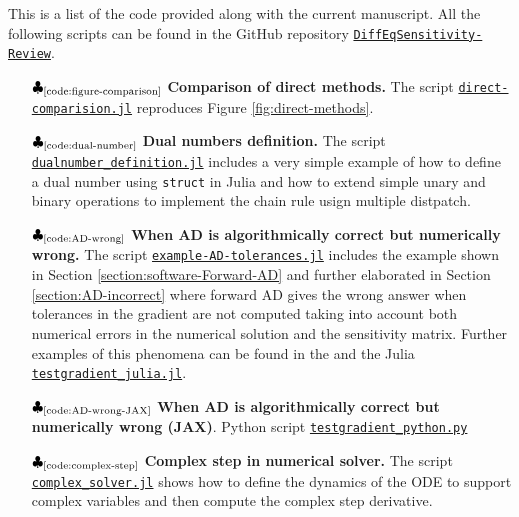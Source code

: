 This is a list of the code provided along with the current manuscript.
All the following scripts can be found in the GitHub repository \href{https://github.com/ODINN-SciML/DiffEqSensitivity-Review}{\texttt{DiffEqSensitivity-Review}}. 
 
\begin{itemize}
    \item[$\clubsuit_\text{\ref{code:figure-comparison}}$] \textbf{Comparison of direct methods.} The script \href{https://github.com/ODINN-SciML/DiffEqSensitivity-Review/blob/main/code/DirectMethods/Comparison/direct-comparision.jl}{\texttt{direct-comparision.jl}} reproduces Figure \ref{fig:direct-methods}.
    \item[$\clubsuit_\text{\ref{code:dual-number}}$] \textbf{Dual numbers definition.} The script \href{https://github.com/ODINN-SciML/DiffEqSensitivity-Review/blob/main/code/DirectMethods/DualNumbers/dualnumber_definition.jl}{\texttt{dualnumber\_definition.jl}} includes a very simple example of how to define a dual number using \texttt{struct} in Julia and how to extend simple unary and binary operations to implement the chain rule usign multiple distpatch. 
    \item[$\clubsuit_\text{\ref{code:AD-wrong}}$] \textbf{When AD is algorithmically correct but numerically wrong.} The script \href{https://github.com/ODINN-SciML/DiffEqSensitivity-Review/blob/main/code/SensitivityForwardAD/example-AD-tolerances.jl}{\texttt{example-AD-tolerances.jl}} includes the example shown in Section \ref{section:software-Forward-AD} and further elaborated in Section \ref{section:AD-incorrect} where forward AD gives the wrong answer when tolerances in the gradient are not computed taking into account both numerical errors in the numerical solution and the sensitivity matrix. Further examples of this phenomena can be found in the  and the Julia \href{https://github.com/ODINN-SciML/DiffEqSensitivity-Review/blob/main/code/SensitivityForwardAD/testgradient_julia.jl}{\texttt{testgradient\_julia.jl}}.
    \item[$\clubsuit_\text{\ref{code:AD-wrong-JAX}}$] \textbf{When AD is algorithmically correct but numerically wrong (JAX)}. Python script \href{https://github.com/ODINN-SciML/DiffEqSensitivity-Review/blob/main/code/SensitivityForwardAD/testgradient_python.py}{\texttt{testgradient\_python.py}}
    \item[$\clubsuit_\text{\ref{code:complex-step}}$] \textbf{Complex step in numerical solver.} The script \href{https://github.com/ODINN-SciML/DiffEqSensitivity-Review/blob/main/code/DirectMethods/ComplexStep/complex_solver.jl}{\texttt{complex\_solver.jl}} shows how to define the dynamics of the ODE to support complex variables and then compute the complex step derivative. 

\end{itemize}
